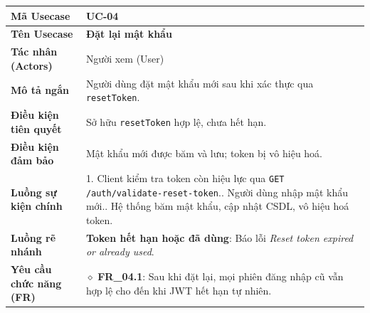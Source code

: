\begin{table}[H]
\renewcommand{\arraystretch}{1.3}
\centering
\begin{tabularx}{\textwidth}{|p{4.5cm}|X|}
\hline
\cellcolor{gray!15}\bfseries Mã Usecase & \textbf{UC-04} \\ \hline
\cellcolor{gray!15}\bfseries Tên Usecase & \textbf{Đặt lại mật khẩu} \\ \hline
\cellcolor{gray!15}\bfseries Tác nhân (Actors) & Người xem (User) \\ \hline
\cellcolor{gray!15}\bfseries Mô tả ngắn & Người dùng đặt mật khẩu mới sau khi xác thực qua \texttt{resetToken}. \\ \hline
\cellcolor{gray!15}\bfseries Điều kiện tiên quyết & Sở hữu \texttt{resetToken} hợp lệ, chưa hết hạn. \\ \hline
\cellcolor{gray!15}\bfseries Điều kiện đảm bảo & Mật khẩu mới được băm và lưu; token bị vô hiệu hoá. \\ \hline
\cellcolor{gray!15}\bfseries Luồng sự kiện chính & 1. Client kiểm tra token còn hiệu lực qua \texttt{GET /auth/validate-reset-token}.\newline 2. Người dùng nhập mật khẩu mới.\newline 3. Hệ thống băm mật khẩu, cập nhật CSDL, vô hiệu hoá token. \\ \hline
\cellcolor{gray!15}\bfseries Luồng rẽ nhánh & \textbf{Token hết hạn hoặc đã dùng}: Báo lỗi \textit{Reset token expired or already used}. \\ \hline
\cellcolor{gray!15}\bfseries Yêu cầu chức năng (FR) & $\diamond$ \textbf{FR\_04.1}: Sau khi đặt lại, mọi phiên đăng nhập cũ vẫn hợp lệ cho đến khi JWT hết hạn tự nhiên. \\ \hline
\end{tabularx}
\end{table}

